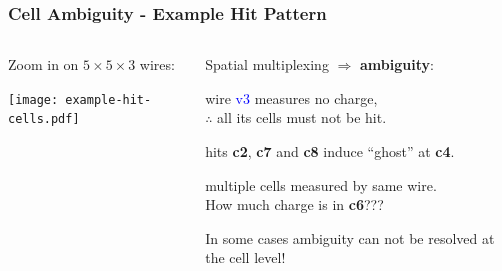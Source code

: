 \documentclass[xcolor=dvipsnames]{beamer}
\begin{document}
\begin{frame}
  \frametitle{Cell Ambiguity - Example Hit Pattern}

  \begin{columns}
    \begin{column}{0.35\textwidth}
      \begin{center}
        \scriptsize Zoom in on $5 \times 5 \times 3$ wires:

        \texttt{[image: example-hit-cells.pdf]}        

      \end{center}
    \end{column}
    \begin{column}{0.65\textwidth}

      Spatial multiplexing $\Rightarrow$ \textbf{ambiguity}:

      \vspace{5mm}

      \begin{description}\scriptsize
      \item[Good] wire \textcolor{blue}{v3} measures no charge, \\$\therefore$ all its cells must not be hit.
      \item[Bad] hits \textbf{c2}, \textbf{c7} and \textbf{c8} induce ``ghost'' at \textbf{c4}.
      \item[Ambiguous] multiple cells measured by same wire.\\
        How much charge is in \textbf{c6}???
      \end{description}

      \vspace{5mm}

      In some cases ambiguity can not be resolved at the cell level!

    \end{column}
  \end{columns}
\end{frame}
\end{document}

